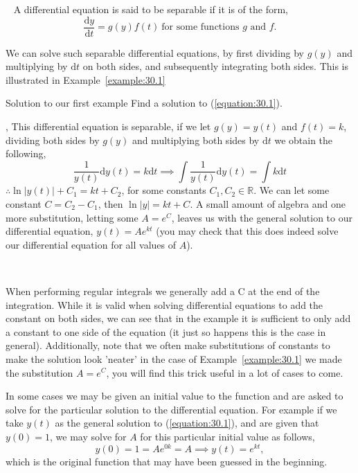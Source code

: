 \begin{definition}{~}
A differential equation is said to be separable if it is of the form,
$$\frac{\mathrm{d}y}{\mathrm{d}t}=g(y)f(t) \ \text{for some functions $g$ and $f$.}$$
\end{definition}

We can solve such separable differential equations, by first dividing by $g(y)$ and multiplying by $\mathrm{d}t$ on both sides, and subsequently integrating both sides. This is illustrated in Example~\ref{example:30.1}

\begin{example}{Solution to our first example}\label{example:30.1}
Find a solution to (\ref{equation:30.1}).

\sep
This differential equation is separable, if we let $g(y)=y(t)$ and $f(t)=k$, dividing both sides by $g(y)$ and multiplying both sides by $\mathrm{d}t$ we obtain the following,
$$\frac{1}{y(t)}\mathrm{d}y(t)=k\mathrm{d}t \implies \int\frac{1}{y(t)}\mathrm{d}y(t)=\int k \mathrm{d}t$$
$\therefore \ln{|y(t)|}+C_{1}=kt+C_{2}$, for some constants $C_{1},C_{2} \in \mathbb{R}$. We can let some constant $C=C_{2}-C_{1}$, then $\ln{|y|}=kt+C$. A small amount of algebra and one more substitution, letting some $A=e^C$, leaves us with the general solution to our differential equation, $y(t)=Ae^{kt}$ (you may check that this does indeed solve our differential equation for all values of $A$).
\end{example}

\begin{insight}{~}

When performing regular integrals we generally add a C at the end of the integration. While it is valid when solving differential equations to add the constant on both sides, we can see that in the example it is sufficient to only add a constant to one side of the equation (it just so happens this is the case in general). Additionally, note that we often make substitutions of constants to make the solution look 'neater' in the case of Example~\ref{example:30.1} we made the substitution $A=e^C$, you will find this trick useful in a lot of cases to come.
\end{insight}

In some cases we may be given an initial value to the function and are asked to solve for the particular solution to the differential equation. For example if we take $y(t)$ as the general solution to (\ref{equation:30.1}), and are given that $y(0)=1$, we may solve for $A$ for this particular initial value as follows,
$$y(0)=1=Ae^{0k}=A \implies y(t)=e^{kt},$$
which is the original function that may have been guessed in the beginning.

